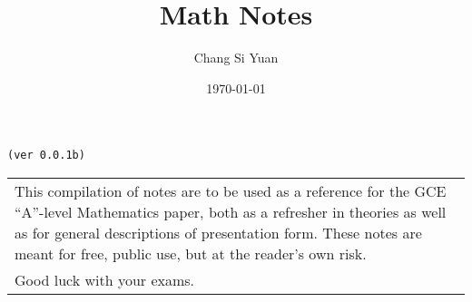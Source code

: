\documentclass[../main]{subfiles}
\begin{document}
\author{Chang Si Yuan}
\title{Math Notes}
\date{\today}

\maketitle

\begin{center}

	\texttt{(ver 0.0.1b)}

	\vspace{50pt}

	\begin{tabular}{>{\flushleft}p{8cm}}
	This compilation of notes are to be used as a reference for the GCE ``A''-level Mathematics paper, both as a refresher in theories as well as for general descriptions of presentation form. These notes are meant for free, public use, but at the reader's own risk. \\
	Good luck with your exams.
	\end{tabular}

	\vspace{50pt}

\end{center}

\newpage
\end{document}
